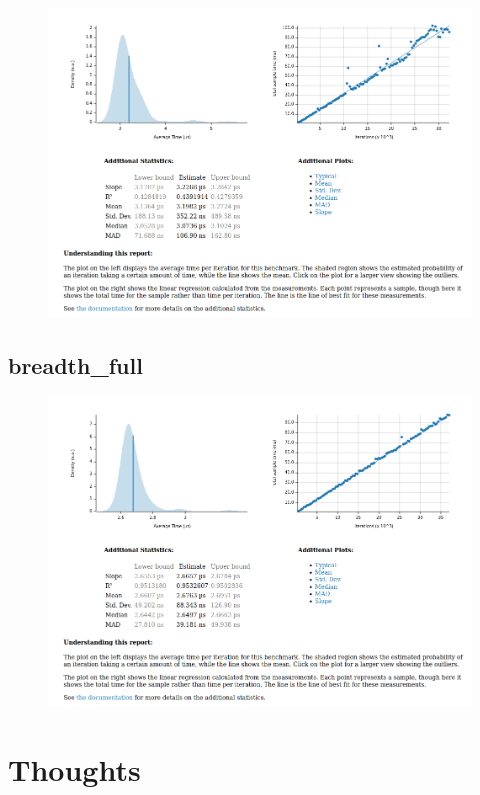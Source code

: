 \begin{figure}[H]
    \centering
    \includegraphics[scale=0.4]{../img/breadth_cancun_cabo_san_lucas}
\end{figure}

\subsection{breadth\_full}

\begin{figure}[H]
\centering
\includegraphics[scale=0.4]{../img/Breadth_full}
\end{figure}



\newpage
\section{Thoughts}

